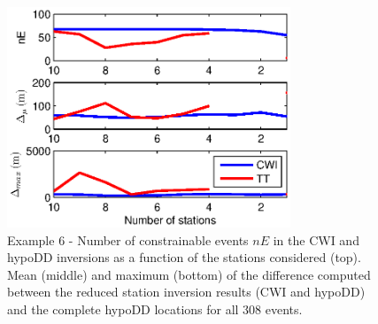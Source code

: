 \documentclass[extra, onecolumn, doublespacing]{gji}
\begin{document}
\begin{figure}
\noindent\includegraphics[width=20pc]{Figure10_c.eps}
\caption{Example 6 - Number of constrainable events $nE$ in the CWI
and hypoDD inversions as a function of the stations considered
(top). Mean (middle) and maximum (bottom) of the difference computed
between the reduced station inversion results (CWI and hypoDD) and
the complete hypoDD locations for all 308 events. }
\label{fig-statremoval_summarystats}
\end{figure}



\end{document}
